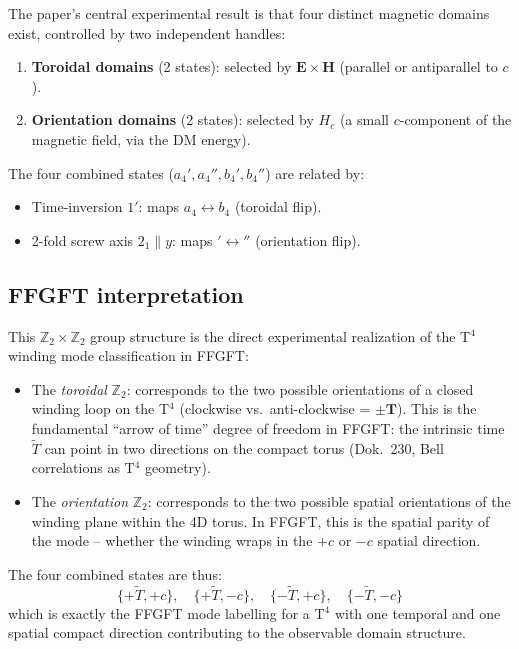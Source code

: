 The paper's central experimental result is that four distinct magnetic
domains exist, controlled by two independent handles:
\begin{enumerate}
  \item \textbf{Toroidal domains} (2 states): selected by $\mathbf{E}\times\mathbf{H}$
        (parallel or antiparallel to $c$).
  \item \textbf{Orientation domains} (2 states): selected by $H_c$ (a small
        $c$-component of the magnetic field, via the DM energy).
\end{enumerate}

\noindent The four combined states ($a_4', a_4'', b_4', b_4''$) are related by:
\begin{itemize}
  \item Time-inversion $1'$: maps $a_4 \leftrightarrow b_4$ (toroidal flip).
  \item 2-fold screw axis $2_1\|y$: maps $'\leftrightarrow''$ (orientation flip).
\end{itemize}

\subsection*{FFGFT interpretation}

This $\mathbb{Z}_2\times\mathbb{Z}_2$ group structure is the direct
experimental realization of the T$^4$ winding mode classification in FFGFT:

\begin{itemize}
  \item The \emph{toroidal} $\mathbb{Z}_2$: corresponds to the two possible
        orientations of a closed winding loop on the T$^4$ (clockwise vs.\
        anti-clockwise = $\pm\mathbf{T}$). This is the fundamental ``arrow of
        time'' degree of freedom in FFGFT: the intrinsic time $\tilde{T}$
        can point in two directions on the compact torus (Dok.~230,
        Bell correlations as T$^4$ geometry).
  \item The \emph{orientation} $\mathbb{Z}_2$: corresponds to the two possible
        spatial orientations of the winding plane within the 4D torus. In
        FFGFT, this is the spatial parity of the mode -- whether the winding
        wraps in the $+c$ or $-c$ spatial direction.
\end{itemize}

\noindent The four combined states are thus:
\[
  \{+\tilde{T},+c\},\quad \{+\tilde{T},-c\},\quad \{-\tilde{T},+c\},\quad
  \{-\tilde{T},-c\}
\]
which is exactly the FFGFT mode labelling for a T$^4$ with one temporal and
one spatial compact direction contributing to the observable domain structure.

